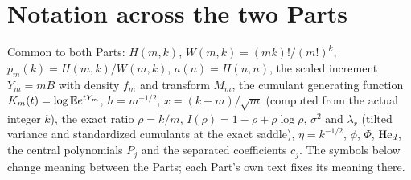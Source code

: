 \documentclass[11pt]{article}
\numberwithin{equation}{section}
\theoremstyle{remark}\newtheorem{remark}[theorem]{Remark}
\begin{document}
\section*{Notation across the two Parts}\label{brs:sec:notation}
Common to both Parts: $H(m,k)$, $W(m,k)=(mk)!/(m!)^k$, $p_m(k)=H(m,k)/W(m,k)$, $a(n)=H(n,n)$, the scaled increment $Y_m=mB$ with density $f_m$ and transform $M_m$, the cumulant generating function $K_m(t)=\log\mathbb E e^{tY_m}$, $h=m^{-1/2}$, $x=(k-m)/\sqrt m$ (computed from the actual integer $k$), the exact ratio $\rho=k/m$, $I(\rho)=1-\rho+\rho\log\rho$, $\sigma^2$ and $\lambda_r$ (tilted variance and standardized cumulants at the exact saddle), $\eta=k^{-1/2}$, $\phi$, $\Phi$, $\operatorname{He}_d$, the central polynomials $P_j$ and the separated coefficients $c_j$. The symbols below change meaning between the Parts; each Part's own text fixes its meaning there.
\end{document}
